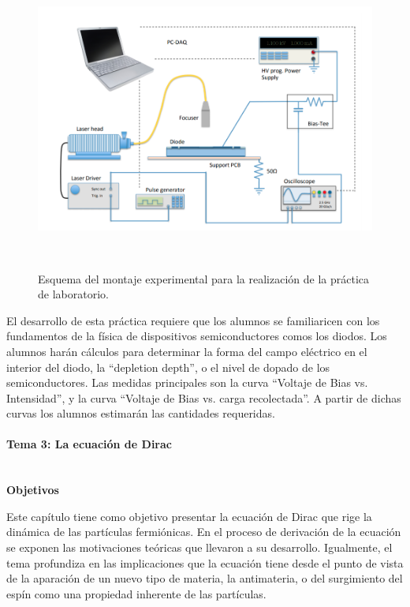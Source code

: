 \begin{figure}[ht]
\centering
\includegraphics[height=10cm]{fig/imagenLab.png}
\caption{Esquema del montaje experimental para la realización de la práctica de laboratorio.}
\label{fig:laser}
\end{figure} 

El desarrollo de esta práctica requiere que los alumnos se familiaricen con los fundamentos de la física de dispositivos semiconductores comos los diodos. Los alumnos harán cálculos para determinar la forma del campo eléctrico en el interior del diodo, la ``depletion depth'', o el nivel de dopado de los semiconductores. Las medidas principales son la curva ``Voltaje de Bias vs. Intensidad'', y la curva ``Voltaje de Bias vs. carga recolectada''. A partir de dichas curvas los alumnos estimarán las cantidades requeridas.   

\paragraph{Tema 3: La ecuación de Dirac\\\\}

\textbf{Objetivos}

Este capítulo tiene como objetivo presentar la ecuación de Dirac que rige la dinámica de las partículas fermiónicas. En el proceso de derivación de la ecuación se exponen las motivaciones teóricas que llevaron a su desarrollo. Igualmente, el tema profundiza en las implicaciones que la ecuación tiene desde el punto de vista de la aparación de un nuevo tipo de materia, la antimateria, o del surgimiento del espín como una propiedad inherente de las partículas.

